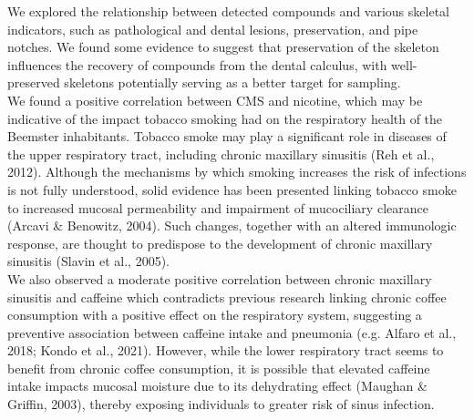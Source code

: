 \documentclass[
]{article}
\begin{document}
We explored the relationship between detected compounds and various
skeletal indicators, such as pathological and dental lesions,
preservation, and pipe notches. We found some evidence to suggest that
preservation of the skeleton influences the recovery of compounds from
the dental calculus, with well-preserved skeletons potentially serving
as a better target for sampling.\\
We found a positive correlation between CMS and nicotine, which may be
indicative of the impact tobacco smoking had on the respiratory health
of the Beemster inhabitants. Tobacco smoke may play a significant role
in diseases of the upper respiratory tract, including chronic maxillary
sinusitis (Reh et al., 2012). Although the mechanisms by which smoking
increases the risk of infections is not fully understood, solid evidence
has been presented linking tobacco smoke to increased mucosal
permeability and impairment of mucociliary clearance (Arcavi \&
Benowitz, 2004). Such changes, together with an altered immunologic
response, are thought to predispose to the development of chronic
maxillary sinusitis (Slavin et al., 2005).\\
We also observed a moderate positive correlation between chronic
maxillary sinusitis and caffeine which contradicts previous research
linking chronic coffee consumption with a positive effect on the
respiratory system, suggesting a preventive association between caffeine
intake and pneumonia (e.g. Alfaro et al., 2018; Kondo et al., 2021).
However, while the lower respiratory tract seems to benefit from chronic
coffee consumption, it is possible that elevated caffeine intake impacts
mucosal moisture due to its dehydrating effect (Maughan \& Griffin,
2003), thereby exposing individuals to greater risk of sinus infection.
\end{document}
